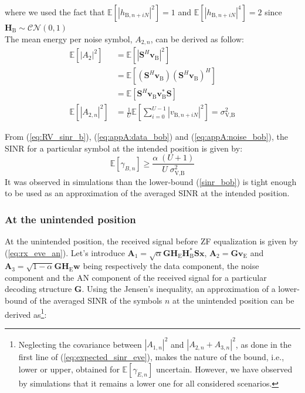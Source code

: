 \documentclass[journal,comsoc]{IEEEtran}
\newcommand{\module}[1]{\left|#1\right|}
\newcommand{\EX}[1]{\mathbb{E} \left[#1\right]}%
\newcommand{\HE}{\textbf{H}_{\text{E}}}
\newcommand{\HB}{\textbf{H}_{\text{B}}}
\newcommand{\vb}{\textbf{v}_{\text{B}}}
\newcommand{\spread}{\textbf{S}}
\newcommand{\w}{\textbf{w}}
\begin{document}
where we used the fact that $\EX{\left| h_{\text{B}, n + iN}\right|^2} = 1$ and $\EX{\left| h_{\text{B}, n + iN}\right|^4} = 2$ since $\HB \sim \mathcal{CN}(0,1)$\\
The mean energy per noise symbol, $A_{2,n}$, can be derived as follow:
\begin{equation}
	\begin{split}
	\EX{|A_2|^2} &=  \EX{\module{\spread^H \vb}^2} \\
	&= \EX{\left(\spread^H \vb \right)\left(\spread^H \vb \right)^H} \\
	&=\EX{\spread^H \vb \vb^* \spread } \\
	\EX{|A_{2,n}|^2} &= \frac{1}{U} \EX{\sum_{i=0}^{U-1} |v_{\text{B}, n + iN}|^2} = \sigma^2_{\text{V,B}}
	\end{split}
	\label{eq:appA:noise_bob}
\end{equation}

From (\ref{eq:RV_sinr_b}), (\ref{eq:appA:data_bob}) and (\ref{eq:appA:noise_bob}), the SINR for a particular symbol at the intended position is given by:
\begin{equation}
\EX{\gamma_{B,n}} \geq \frac{\alpha \;(U+1)}{U \; \sigma_{\text{V,B}}^2}
\label{sinr_bob}
\end{equation}
It was observed in simulations than the lower-bound (\ref{sinr_bob}) is tight enough to be used as an approximation of the averaged SINR at the intended position. 


\subsubsection{At the unintended position}
At the unintended position, the received signal before ZF equalization is given by (\ref{eq:rx_eve_an}). Let's introduce $\textbf{A}_1 = \sqrt{\alpha}  \textbf{G} \HE \HB^* \spread\textbf{x} $, $\textbf{A}_2 = \textbf{G}  \textbf{v}_\text{E}$ and $\textbf{A}_3 = \sqrt{1-\alpha} \textbf{G} \HE \w$ being respectively the data component, the noise component and the AN component of the received signal for a particular decoding structure $\textbf{G}$. Using the Jensen's inequality, an approximation of a lower-bound of the averaged SINR of the symbols $n$ at the unintended position can be derived as\footnote{Neglecting the covariance between $\left|A_{1,n}\right|^2$ and $\left| A_{2,n} + A_{3,n}\right|^2$, as  done in the first line of (\ref{eq:expected_sinr_eve}), makes the nature of the bound, i.e., lower or upper, obtained for $\EX{\gamma_{E,n}}$ uncertain. However, we have observed by simulations that it remains a lower one for all considered scenarios.}:
\end{document}
